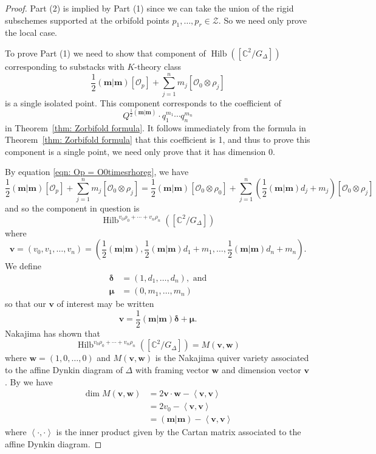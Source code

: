 \documentclass{amsart}
\theoremstyle{definition}
\newcommand{\half}{\frac{1}{2}}
\newcommand{\CC} {{\mathbb C}}          %
\renewcommand{\O}{\mathcal{O}}
\newcommand{\mvec}{\bm{m}}
\newcommand{\deltavec}{\bm{\delta  }}
\newcommand{\muvec}{\bm{\mu  }}
\newcommand{\vvec}{\bm{v }}
\newcommand{\wvec}{\bm{w }}
\newcommand{\Hilb}{\operatorname{Hilb}}
\begin{document}
\begin{proof}
	Part (2) is implied by Part (1) since we can take the union of the rigid subschemes supported at the orbifold points $p_1,\dots,p_r \in \mathcal{Z}$. So we need only prove the local case.
	
To prove Part (1) we need to show that component of $\Hilb
([\CC^{2}/G_{\Delta}])$ corresponding to substacks with $K$-theory
class
\[
\half (\mvec|\mvec)[\O_{p}] + \sum_{j=1}^{n}
m_{j}[\O_{0}\otimes \rho_{j}]
\]
is a single isolated point. This component corresponds to the
coefficient of 
\[
Q^{\half(\mvec |\mvec )}\cdot  q_{1}^{m_{1}}\dotsb q_{n}^{m_{n}}
\]
in Theorem~\ref{thm: Zorbifold formula}. It follows immediately from
the formula in Theorem~\ref{thm: Zorbifold formula} that this
coefficient is 1, and thus to prove this component is a single point,
we need only prove that it has dimension 0.

By equation \eqref{eqn: Op
= O0timesrhoreg}, we have
\[
\half (\mvec|\mvec)[\O_{p}] + \sum_{j=1}^{n}
m_{j}[\O_{0}\otimes \rho_{j}] = 
\half (\mvec|\mvec)[\O_{0}\otimes \rho_{0}] + \sum_{j=1}^{n}
\left(\half (\mvec |\mvec )d_{j}+m_{j} \right)[\O_{0}\otimes \rho_{j}]
\]
and so the component in question is 
\[
\Hilb^{v_{0}\rho_{0}+\dotsb +v_{n}\rho_{n}}([\CC^{2} /G_{\Delta}])
\]
where
\[
\vvec =(v_{0},v_{1},\dotsc ,v_{n}) = \left(\half (\mvec |\mvec ),\half (\mvec |\mvec )d_{1}+m_{1},\dotsc ,\half (\mvec |\mvec )d_{n}+m_{n} \right).
\]
We define
\begin{align*}
\deltavec& = (1,d_{1},\dotsc ,d_{n}),\text{ and}\\
\muvec &= (0,m_{1},\dotsc ,m_{n})
\end{align*}
so that our $\vvec$ of interest may be written
\[
\vvec =\half (\mvec |\mvec )\deltavec +\muvec .
\]
Nakajima has shown \cite[\S~2]{nakajima2002geometric} that 
\[
\Hilb^{v_{0}\rho_{0}+\dotsb +v_{n}\rho_{n}}([\CC^{2} /G_{\Delta}]) = M(\vvec ,\wvec )
\]
where $\wvec = (1,0,\dotsc ,0)$ and $M(\vvec ,\wvec )$ is the Nakajima
quiver variety associated to the affine Dynkin diagram of $\Delta$
with framing vector $\wvec$ and dimension vector $\vvec$. By
\cite[(2.6)]{Nakajima1994Duke} we have 
\begin{align}\label{eqn: dimension formula for quiver varieties}
\dim M(\vvec ,\wvec )& = 2\vvec \cdot \wvec -\left\langle \vvec ,\vvec \right\rangle\\ \nonumber
&= 2v_{0} - \left\langle \vvec ,\vvec \right\rangle\\ \nonumber
&=(\mvec |\mvec ) - \left\langle \vvec ,\vvec\right\rangle
\end{align}
where $\left\langle \cdot , \cdot  \right\rangle$ is the inner product
given by the Cartan matrix associated to the affine Dynkin diagram.


\end{proof}
\end{document}
